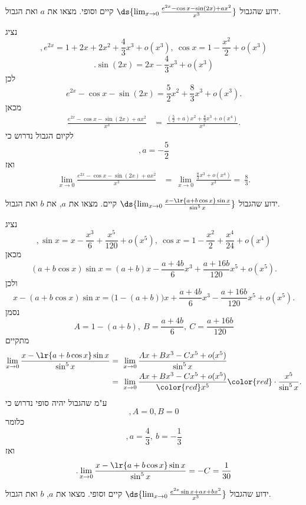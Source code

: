 \bE
 \item ידוע שהגבול $\ds{\lim_{x\to 0}\frac{e^{2x}-\cos x-\sin(2x)+ax^2}{x^3}}$ קיים וסופי. מצאו את $a$  ואת הגבול.
\begin{solbox}
נציג
$$,e^{2x}=1+2x+2x^2+\frac{4}{3}x^3+o(x^3),\ \cos x=1-\frac{x^2}{2}+o(x^3)$$
$$.\sin(2x)=2x-\frac{4}{3}x^3+o(x^3)$$
לכן
\[
e^{2x}-\cos x-\sin(2x)=\frac{5}{2}x^2+\frac{8}{3}x^3+o(x^3).
\]
מכאן
\begin{align*}
    \frac{e^{2x}-\cos x-\sin(2x)+ax^2}{x^3}&=\ \frac{\left(\frac{5}{2}+a\right)x^2+\frac{8}{3}x^3+o(x^4)}{x^3}.
\end{align*}
לקיום הגבול נדרוש כי
$$,a=-\frac{5}{2}$$
ואז
\begin{align*}
    \lim_{x\to 0}\frac{e^{2x}-\cos x-\sin(2x)+ax^2}{x^3}&=\ \lim_{x\to 0}\frac{\frac{8}{3}x^3+o(x^4)}{x^3}
    =\ \frac{8}{3}.
\end{align*}
\end{solbox}
 \item ידוע שהגבול $\ds{\lim_{x \to 0}\frac{x-\lr{a+b\cos x}\sin x}{\sin^5x}}$ קיים. מצאו את $a$, את $b$ ואת הגבול.
\begin{solbox}
נציג
\[
,\sin x=x-\frac{x^3}{6}+\frac{x^5}{120}+o(x^5),\
\cos x=1-\frac{x^2}{2}+\frac{x^4}{24}+o(x^4)
\]
מכאן
\[
(a+b\cos x)\sin x=(a+b)x-\frac{a+4b}{6}x^3+\frac{a+16b}{120}x^5+o(x^5).
\]
ולכן
\[
x-(a+b\cos x)\sin x=\bigl(1-(a+b)\bigr)x+\frac{a+4b}{6}x^3-\frac{a+16b}{120}x^5+o(x^5).
\]
נסמן
$$A=1-(a+b),\ B=\frac{a+4b}{6},\ C=\frac{a+16b}{120}$$
מתקיים
\begin{align*}
    \lim_{x \to 0}\frac{x-\lr{a+b\cos x}\sin x}{\sin^5x}&=\ \lim_{x \to 0}\frac{Ax+Bx^3-Cx^5+o(x^5)}{\sin^5x}\\
    &=\ \lim_{x \to 0}\frac{Ax+Bx^3-Cx^5+o(x^5)}{\color{red}x^5}{\color{red}\cdot\frac{x^5}{\sin^5x}}.
\end{align*}
ע"מ שהגבול יהיה סופי נדרוש כי
$$,A=0, B=0$$
כלומר
$$,a=\frac{4}{3},\ b=-\frac{1}{3}$$
ואז
$$.\lim_{x \to 0}\frac{x-\lr{a+b\cos x}\sin x}{\sin^5x}=-C=\frac{1}{30}$$
\end{solbox}
 \item ידוע שהגבול $\ds{\lim_{x\to 0}\frac{e^{2x}\sin x+ax+bx^2}{x^3}}$ קיים וסופי. מצאו את $a$, $b$ ואת הגבול.
